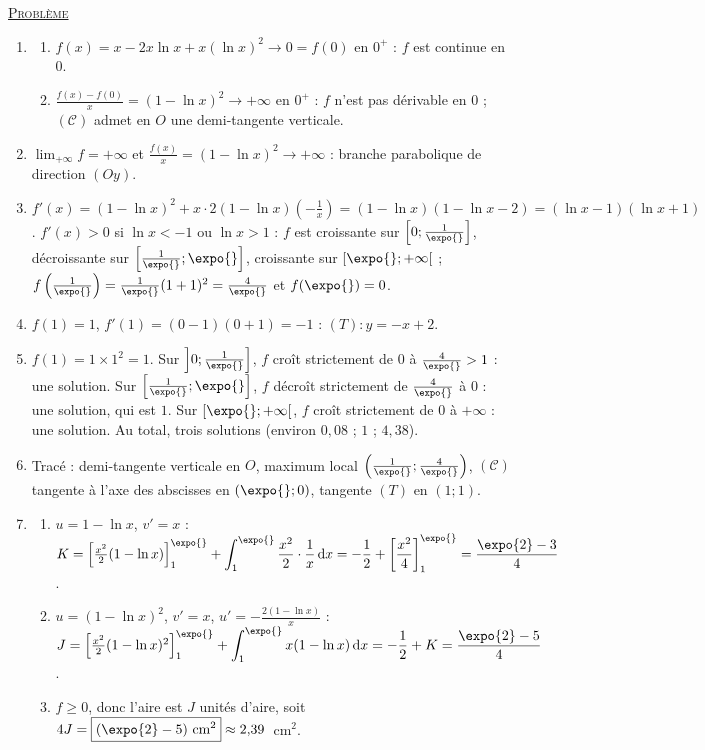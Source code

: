 \begin{corrige}
\noindent \underline{\textsc{Probl\`eme}}
\begin{enumerate}
\item \begin{enumerate}
      \item $f(x) = x - 2x\ln x + x(\ln x)^2 \to 0 = f(0)$ en $0^+$ : $f$ est continue en $0$.
      \item $\frac{f(x) - f(0)}{x} = (1 - \ln x)^2 \to +\infty$ en $0^+$ : $f$ n'est pas d\'erivable en $0$ ;
            $(\mathscr{C})$ admet en $O$ une demi-tangente verticale.
      \end{enumerate}
\item $\lim_{+\infty} f = +\infty$ et $\frac{f(x)}{x} = (1 - \ln x)^2 \to +\infty$ : branche parabolique de direction $(Oy)$.
\item $f'(x) = (1 - \ln x)^2 + x \cdot 2(1 - \ln x)\left(-\frac{1}{x}\right) = (1 - \ln x)(1 - \ln x - 2) = (\ln x - 1)(\ln x + 1)$.
      $f'(x) > 0$ si $\ln x < -1$ ou $\ln x > 1$ : $f$ est croissante sur $\left[0 ; \frac{1}{\expo{}}\right]$, d\'ecroissante sur
      $\left[\frac{1}{\expo{}} ; \expo{}\right]$, croissante sur $[\expo{} ; +\infty[$ ;
      $f\left(\frac{1}{\expo{}}\right) = \frac{1}{\expo{}}(1 + 1)^2 = \frac{4}{\expo{}}$ et $f(\expo{}) = 0$.
\item $f(1) = 1$, $f'(1) = (0 - 1)(0 + 1) = -1$ : $(T) : y = -x + 2$.
\item $f(1) = 1 \times 1^2 = 1$. Sur $\left]0 ; \frac{1}{\expo{}}\right]$, $f$ cro\^it strictement de $0$ \`a $\frac{4}{\expo{}} > 1$ : une solution.
      Sur $\left[\frac{1}{\expo{}} ; \expo{}\right]$, $f$ d\'ecro\^it strictement de $\frac{4}{\expo{}}$ \`a $0$ : une solution, qui est $1$.
      Sur $[\expo{} ; +\infty[$, $f$ cro\^it strictement de $0$ \`a $+\infty$ : une solution. Au total, trois solutions
      (environ $0{,}08$ ; $1$ ; $4{,}38$).
\item Trac\'e : demi-tangente verticale en $O$, maximum local $\left(\frac{1}{\expo{}} ; \frac{4}{\expo{}}\right)$,
      $(\mathscr{C})$ tangente \`a l'axe des abscisses en $(\expo{} ; 0)$, tangente $(T)$ en $(1 ; 1)$.
\item \begin{enumerate}
      \item $u = 1 - \ln x$, $v' = x$ : $K = \left[\frac{x^2}{2}(1 - \ln x)\right]_1^{\expo{}} + \displaystyle\int_1^{\expo{}} \frac{x^2}{2}\cdot\frac{1}{x}\,\mathrm{d}x
            = -\frac{1}{2} + \left[\frac{x^2}{4}\right]_1^{\expo{}} = \frac{\expo{2} - 3}{4}$.
      \item $u = (1 - \ln x)^2$, $v' = x$, $u' = -\frac{2(1 - \ln x)}{x}$ :
            $J = \left[\frac{x^2}{2}(1 - \ln x)^2\right]_1^{\expo{}} + \displaystyle\int_1^{\expo{}} x(1 - \ln x)\,\mathrm{d}x = -\frac{1}{2} + K = \frac{\expo{2} - 5}{4}$.
      \item $f \geq 0$, donc l'aire est $J$ unit\'es d'aire, soit $4J = \boxed{(\expo{2} - 5) \text{ cm}^2} \approx 2{,}39$~cm$^2$.
      \end{enumerate}
\end{enumerate}


\end{corrige}
